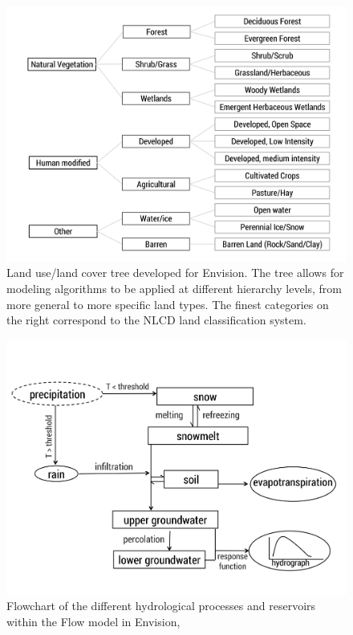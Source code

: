 \documentclass[11pt,letterpaper]{article}
\begin{document}
\begin{figure}
\centering
\includegraphics[width=\textwidth]{figure-files/figure2.png}
\caption{Land use/land cover tree developed for Envision. The tree allows for modeling algorithms to be applied at different hierarchy levels, from more general to more specific land types. The finest categories on the right correspond to the NLCD land classification system.}
\label{fig:LULCtree}
\end{figure}
\clearpage

\begin{figure}
\centering
\includegraphics[width=\textwidth]{figure-files/figure3.png}
\caption{Flowchart of the different hydrological processes and reservoirs within the Flow model in Envision, \citep[modified from][]{Han:2017tx}}
\label{fig:ModelFlowchart}
\end{figure}
\clearpage
\end{document}
